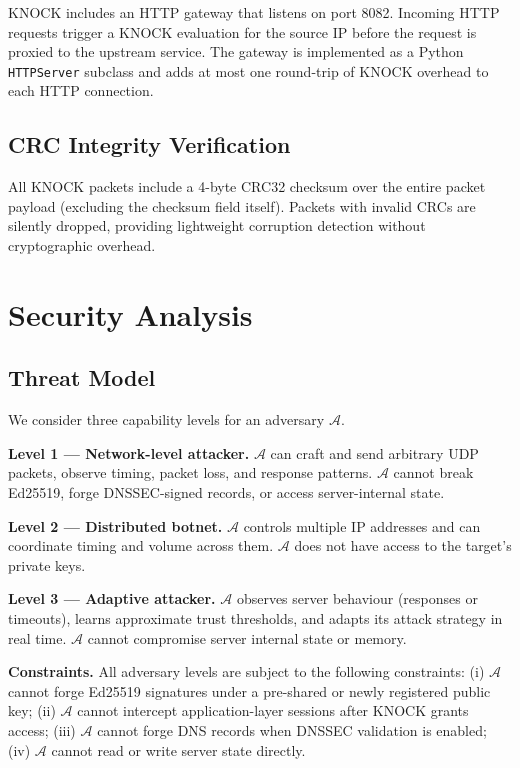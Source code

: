 \documentclass[10pt,conference]{IEEEtran}
\begin{document}
KNOCK includes an HTTP gateway that listens on port 8082.  Incoming
HTTP requests trigger a KNOCK evaluation for the source IP before the
request is proxied to the upstream service.  The gateway is implemented
as a Python \texttt{HTTPServer} subclass and adds at most one
round-trip of KNOCK overhead to each HTTP connection.

\subsection{CRC Integrity Verification}

All KNOCK packets include a 4-byte CRC32 checksum over the entire
packet payload (excluding the checksum field itself).  Packets with
invalid CRCs are silently dropped, providing lightweight corruption
detection without cryptographic overhead.

\section{Security Analysis}
\label{sec:security}

\subsection{Threat Model}
\label{sec:threat}

We consider three capability levels for an adversary $\mathcal{A}$.

\textbf{Level 1 — Network-level attacker.}
$\mathcal{A}$ can craft and send arbitrary UDP packets, observe
timing, packet loss, and response patterns.  $\mathcal{A}$ cannot
break Ed25519, forge DNSSEC-signed records, or access server-internal
state.

\textbf{Level 2 — Distributed botnet.}
$\mathcal{A}$ controls multiple IP addresses and can coordinate timing
and volume across them.  $\mathcal{A}$ does not have access to the
target's private keys.

\textbf{Level 3 — Adaptive attacker.}
$\mathcal{A}$ observes server behaviour (responses or timeouts),
learns approximate trust thresholds, and adapts its attack strategy
in real time.  $\mathcal{A}$ cannot compromise server internal state
or memory.

\textbf{Constraints.}
All adversary levels are subject to the following constraints:
(i) $\mathcal{A}$ cannot forge Ed25519 signatures under a pre-shared
or newly registered public key;
(ii) $\mathcal{A}$ cannot intercept application-layer sessions after
KNOCK grants access;
(iii) $\mathcal{A}$ cannot forge DNS records when DNSSEC validation
is enabled;
(iv) $\mathcal{A}$ cannot read or write server state directly.
\end{document}
